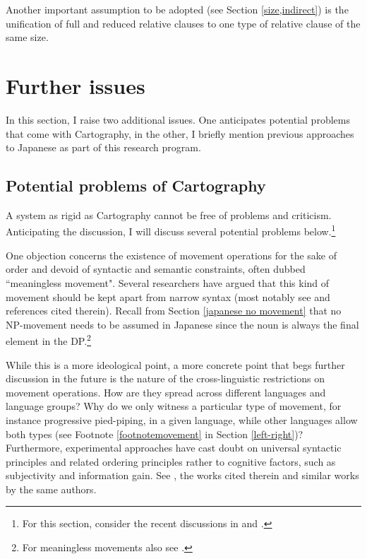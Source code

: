 Another important assumption to be adopted (see Section \ref{size,indirect}) is the unification of full and reduced relative clauses to one type of relative clause of the same size.

\section{Further issues}

In this section, I raise two additional issues. One anticipates potential problems that come with Cartography, in the other, I briefly mention previous approaches to Japanese as part of this research program.

\subsection{Potential problems of Cartography} \label{problemscarto}

A system as rigid as Cartography cannot be free of problems and criticism. Anticipating the discussion, I will discuss several potential problems below.\footnote{For this section, consider the recent discussions in \citet{manzini:2025:left} and \citet{cinque:2025:superiority}.}

One objection concerns the existence of movement operations for the sake of order and devoid of syntactic and semantic constraints, often dubbed ``meaningless movement". Several researchers have argued that this kind of movement should be kept apart from narrow syntax (most notably see \citealt{chomsky:2019:generative} and references cited therein). Recall from Section \ref{japanese no movement} that no NP-movement needs to be assumed in Japanese since the noun is always the final element in the DP.\footnote{For meaningless movements also see \citet{hall:2015:spelling}.} 

While this is a more ideological point, a more concrete point that begs further discussion in the future is the nature of the cross-linguistic restrictions on movement operations. How are they spread across different languages and language groups? Why do we only witness a particular type of movement, for instance progressive pied-piping, in a given language, while other languages allow both types (see Footnote \ref{footnotemovement} in Section \ref{left-right})? Furthermore, experimental approaches have cast doubt on universal syntactic principles and related ordering principles rather to cognitive factors, such as subjectivity and information gain. See \citet{scontras:2017:sub, dyer:2024:evaluating}, the works cited therein and similar works by the same authors.

